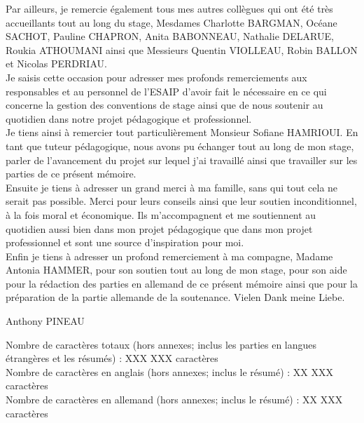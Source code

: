 \documentclass[a4paper, 12pt, french]{article}
\begin{document}
		Par ailleurs, je remercie également tous mes autres collègues qui ont été très accueillants tout au long du stage, Mesdames Charlotte BARGMAN, Océane SACHOT, Pauline CHAPRON, Anita BABONNEAU, Nathalie DELARUE, Roukia ATHOUMANI ainsi que Messieurs Quentin VIOLLEAU, Robin BALLON et Nicolas PERDRIAU.\\

		Je saisis cette occasion pour adresser mes profonds remerciements aux responsables et au personnel de l’ESAIP d’avoir fait le nécessaire en ce qui concerne la gestion des conventions de stage ainsi que de nous soutenir au quotidien dans notre projet pédagogique et professionnel.\\

		Je tiens ainsi à remercier tout particulièrement Monsieur Sofiane HAMRIOUI. En tant que tuteur pédagogique, nous avons pu échanger tout au long de mon stage, parler de l’avancement du projet sur lequel j'ai travaillé ainsi que travailler sur les parties de ce présent mémoire.\\

		Ensuite je tiens à adresser un grand merci à ma famille, sans qui tout cela ne serait pas possible. Merci pour leurs conseils ainsi que leur soutien inconditionnel, à la fois moral et économique. Ils m’accompagnent et me soutiennent au quotidien aussi bien dans mon projet pédagogique que dans mon projet professionnel et sont une source d’inspiration pour moi.\\

		Enfin je tiens à adresser un profond remerciement à ma compagne, Madame Antonia HAMMER, pour son soutien tout au long de mon stage, pour son aide pour la rédaction des parties en allemand de ce présent mémoire ainsi que pour la préparation de la partie allemande de la soutenance. Vielen Dank meine Liebe.

		\vspace{\baselineskip}\vspace{\baselineskip}\vspace{\baselineskip}
		\noindent
		Anthony PINEAU

	\newpage

	\normalsize
	
	\tableofcontents

	\vspace{\baselineskip}
	\noindent Nombre de caractères totaux (hors annexes; inclus les parties en langues étrangères et les résumés) : XXX XXX caractères\\
	Nombre de caractères en anglais (hors annexes; inclus le résumé) : XX XXX caractères\\
	Nombre de caractères en allemand (hors annexes; inclus le résumé) : XX XXX caractères\\
\end{document}
